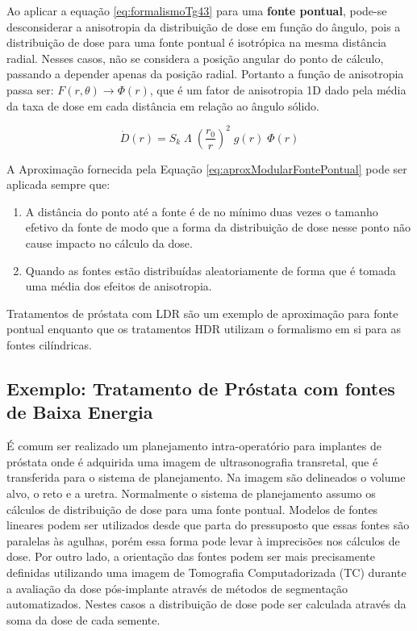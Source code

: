 \documentclass[11pt,a4paper]{article}
\begin{document}
			Ao aplicar a equação \ref{eq:formalismoTg43} para uma \textbf{\textcolor{CarnationPink}{fonte pontual}}, pode-se desconsiderar a anisotropia da distribuição de dose em função do ângulo,  pois a distribuição de dose para uma fonte pontual é isotrópica na mesma distância radial. Nesses casos, não se considera a posição angular do ponto de cálculo, passando a depender apenas da posição radial. Portanto a função de anisotropia passa ser: $F(r, \theta) \rightarrow \Phi (r)$,  que é um fator de anisotropia 1D dado pela média da taxa de dose em cada distância em relação ao ângulo sólido.
			
			\begin{equation}
				\dot{D}(r) = S_k \; \varLambda \; \left(\frac{r_0}{r} \right)^2 \; g(r) \; \Phi (r)
				\label{eq:aproxModularFontePontual}
			\end{equation}
			
			A Aproximação fornecida pela Equação \ref{eq:aproxModularFontePontual} pode ser aplicada sempre que:

			\begin{enumerate}
				\item A distância do ponto até a fonte é de no mínimo duas vezes o tamanho efetivo da fonte de modo que a forma da distribuição de dose nesse ponto não cause impacto no cálculo da dose.
				\item Quando as fontes estão distribuídas aleatoriamente de forma que é tomada uma média dos efeitos de anisotropia.
			\end{enumerate}

			Tratamentos de próstata com LDR são um exemplo de aproximação para fonte pontual enquanto que os tratamentos HDR utilizam o formalismo em si para as fontes cilíndricas.

		\subsection*{\textcolor{CarnationPink}{Exemplo: Tratamento de Próstata com fontes de Baixa Energia}}

			É comum ser realizado um planejamento intra-operatório para implantes de próstata onde é adquirida uma imagem de ultrasonografia transretal, que é transferida para o sistema de planejamento. Na imagem são delineados o volume alvo, o reto e a uretra. Normalmente o sistema de planejamento assumo os cálculos de distribuição de dose para uma fonte pontual. Modelos de fontes lineares podem ser utilizados desde que parta do pressuposto que essas fontes são paralelas às agulhas, porém essa forma pode levar à imprecisões nos cálculos de dose. Por outro lado, a orientação das fontes podem ser mais precisamente definidas utilizando uma imagem de Tomografia Computadorizada (TC) durante a avaliação da dose pós-implante através de métodos de segmentação automatizados. Nestes casos a distribuição de dose pode ser calculada através da soma da dose de cada semente.
\end{document}
